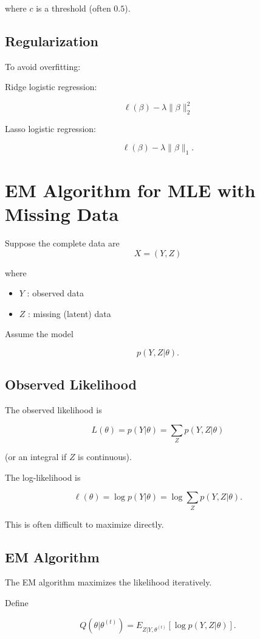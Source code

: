 \documentclass[a4paper,10pt]{article}
\begin{document}
where $c$ is a threshold (often $0.5$).

\subsection{Regularization}

To avoid overfitting:

Ridge logistic regression:

\[
\ell(\beta) - \lambda \|\beta\|_2^2
\]

Lasso logistic regression:

\[
\ell(\beta) - \lambda \|\beta\|_1.
\]

\section{EM Algorithm for MLE with Missing Data}

Suppose the complete data are
\[
X = (Y,Z)
\]

where

\begin{itemize}
\item $Y$ : observed data
\item $Z$ : missing (latent) data
\end{itemize}

Assume the model

\[
p(Y,Z|\theta).
\]

\subsection{Observed Likelihood}

The observed likelihood is

\[
L(\theta)
=
p(Y|\theta)
=
\sum_Z p(Y,Z|\theta)
\]

(or an integral if $Z$ is continuous).

The log-likelihood is

\[
\ell(\theta)
=
\log p(Y|\theta)
=
\log \sum_Z p(Y,Z|\theta).
\]

This is often difficult to maximize directly.

\subsection{EM Algorithm}

The EM algorithm maximizes the likelihood iteratively.

Define

\[
Q(\theta|\theta^{(t)})
=
E_{Z|Y,\theta^{(t)}}
[
\log p(Y,Z|\theta)
].
\]
\end{document}

